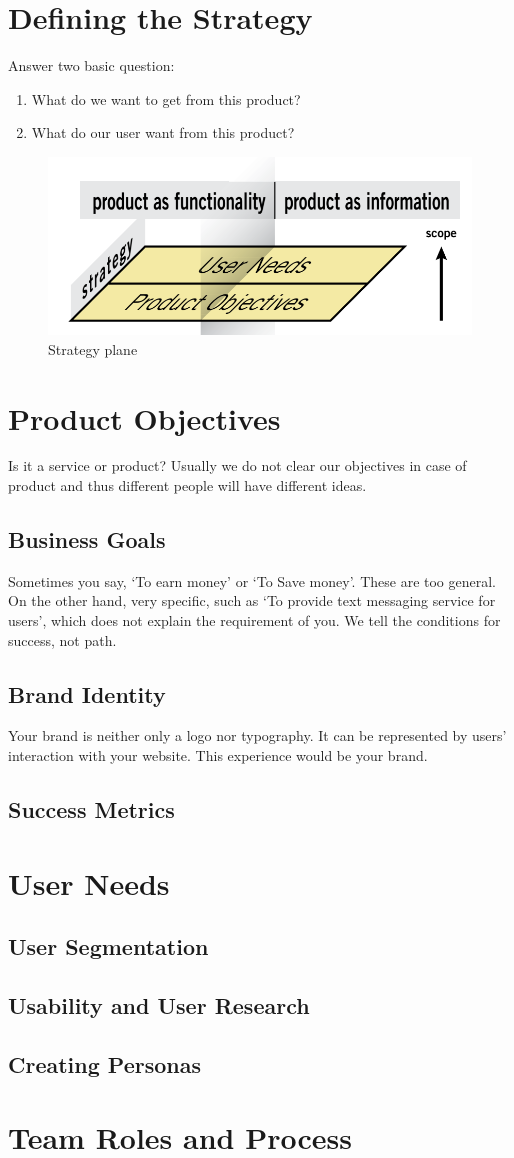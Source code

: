\section{Defining the Strategy}
    Answer two basic question:
    \begin{enumerate}
        \item What do we want to get from this product?
        \item What do our user want from this product?
    \end{enumerate}
    \begin{figure}
        \includegraphics[width=\linewidth]{images/pic2.png}
        \caption{Strategy plane}
    \end{figure}
\section{Product Objectives}
    Is it a service or product? Usually we do not clear our objectives in case of product and thus different people will have different ideas.
\subsection{Business Goals}
    Sometimes you say, ‘To earn money’ or ‘To Save money’. These are too general. On the other hand, very specific, such as ‘To provide text messaging service for users’, which does not explain the requirement of you. We tell the conditions for success, not path.
\subsection{Brand Identity}
    Your brand is neither only a logo nor typography. It can be represented by users’ interaction with your website. This experience would be your brand.
\subsection{Success Metrics}
\section{User Needs}
\subsection{User Segmentation}
\subsection{Usability and User Research}
\subsection{Creating Personas}
\section{Team Roles and Process}
